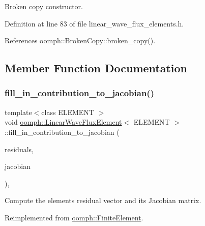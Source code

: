 Broken copy constructor. 



Definition at line 83 of file linear\+\_\+wave\+\_\+flux\+\_\+elements.\+h.



References oomph\+::\+Broken\+Copy\+::broken\+\_\+copy().



\subsection{Member Function Documentation}
\mbox{\label{classoomph_1_1LinearWaveFluxElement_a76f1a46c72f1ba9c18109416967a568f}} 
\subsubsection{\texorpdfstring{fill\+\_\+in\+\_\+contribution\+\_\+to\+\_\+jacobian()}{fill\_in\_contribution\_to\_jacobian()}}
{\footnotesize\ttfamily template$<$class E\+L\+E\+M\+E\+NT $>$ \\
void \hyperlink{classoomph_1_1LinearWaveFluxElement}{oomph\+::\+Linear\+Wave\+Flux\+Element}$<$ E\+L\+E\+M\+E\+NT $>$\+::fill\+\_\+in\+\_\+contribution\+\_\+to\+\_\+jacobian (\begin{DoxyParamCaption}\item[{\hyperlink{classoomph_1_1Vector}{Vector}$<$ double $>$ \&}]{residuals,  }\item[{\hyperlink{classoomph_1_1DenseMatrix}{Dense\+Matrix}$<$ double $>$ \&}]{jacobian }\end{DoxyParamCaption})\hspace{0.3cm}{\ttfamily [inline]}, {\ttfamily [virtual]}}



Compute the element\textquotesingle{}s residual vector and its Jacobian matrix. 



Reimplemented from \hyperlink{classoomph_1_1FiniteElement_a0ae7af222af38a0d53bf283dc85bdfea}{oomph\+::\+Finite\+Element}.



